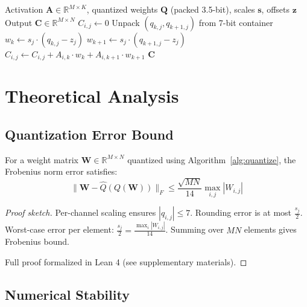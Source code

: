 \documentclass{article}
\begin{document}
\begin{algorithm}[H]
\caption{3.5-bit Matrix Multiplication}
\label{alg:matmul}
\begin{algorithmic}[1]
\REQUIRE Activation $\mathbf{A} \in \mathbb{R}^{M \times K}$, quantized weights $\mathbf{Q}$ (packed 3.5-bit), scales $\mathbf{s}$, offsets $\mathbf{z}$
\ENSURE Output $\mathbf{C} \in \mathbb{R}^{M \times N}$
        \STATE $C_{i,j} \gets 0$
            \STATE Unpack $(q_{k,j}, q_{k+1,j})$ from 7-bit container
            \STATE $w_k \gets s_j \cdot (q_{k,j} - z_j)$
            \STATE $w_{k+1} \gets s_j \cdot (q_{k+1,j} - z_j)$
            \STATE $C_{i,j} \gets C_{i,j} + A_{i,k} \cdot w_k + A_{i,k+1} \cdot w_{k+1}$
        \ENDFOR
    \ENDFOR
\ENDFOR
\RETURN $\mathbf{C}$
\end{algorithmic}
\end{algorithm}

\section{Theoretical Analysis}
\label{sec:theory}

\subsection{Quantization Error Bound}

\begin{theorem}
\label{thm:error_bound}
For a weight matrix $\mathbf{W} \in \mathbb{R}^{M \times N}$ quantized using Algorithm~\ref{alg:quantize}, the Frobenius norm error satisfies:
\begin{equation}
    \|\mathbf{W} - \hat{Q}(Q(\mathbf{W}))\|_F \leq \frac{\sqrt{MN}}{14} \max_{i,j} |W_{i,j}|
\end{equation}
\end{theorem}

\begin{proof}[Proof sketch]
Per-channel scaling ensures $|q_{i,j}| \leq 7$. Rounding error is at most $\frac{s_j}{2}$. Worst-case error per element: $\frac{s_j}{2} = \frac{\max_i |W_{i,j}|}{14}$. Summing over $MN$ elements gives Frobenius bound.

Full proof formalized in Lean 4 (see supplementary materials).
\end{proof}

\subsection{Numerical Stability}
\end{document}
